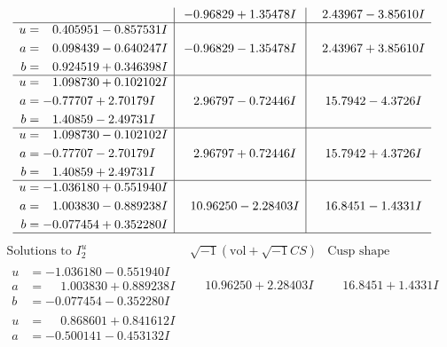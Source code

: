 \documentclass[1p]{elsarticle_modified}
\theoremstyle{definition}
\newcommand{\I}{\sqrt{-1}}
\begin{document}
$$\begin{array}{c|c|c}
 & -0.96829 + 1.35478 I & \phantom{-}2.43967 - 3.85610 I \\ \hline\begin{aligned}
u &= \phantom{-}0.405951 - 0.857531 I \\
a &= \phantom{-}0.098439 - 0.640247 I \\
b &= \phantom{-}0.924519 + 0.346398 I\end{aligned}
 & -0.96829 - 1.35478 I & \phantom{-}2.43967 + 3.85610 I \\ \hline\begin{aligned}
u &= \phantom{-}1.098730 + 0.102102 I \\
a &= -0.77707 + 2.70179 I \\
b &= \phantom{-}1.40859 - 2.49731 I\end{aligned}
 & \phantom{-}2.96797 - 0.72446 I & \phantom{-}15.7942 - 4.3726 I \\ \hline\begin{aligned}
u &= \phantom{-}1.098730 - 0.102102 I \\
a &= -0.77707 - 2.70179 I \\
b &= \phantom{-}1.40859 + 2.49731 I\end{aligned}
 & \phantom{-}2.96797 + 0.72446 I & \phantom{-}15.7942 + 4.3726 I \\ \hline\begin{aligned}
u &= -1.036180 + 0.551940 I \\
a &= \phantom{-}1.003830 - 0.889238 I \\
b &= -0.077454 + 0.352280 I\end{aligned}
 & \phantom{-}10.96250 - 2.28403 I & \phantom{-}16.8451 - 1.4331 I\\
 \hline 
 \end{array}$$\newpage$$\begin{array}{c|c|c}  
\text{Solutions to }I^u_{2}& \I (\text{vol} + \sqrt{-1}CS) & \text{Cusp shape}\\
 \hline 
\begin{aligned}
u &= -1.036180 - 0.551940 I \\
a &= \phantom{-}1.003830 + 0.889238 I \\
b &= -0.077454 - 0.352280 I\end{aligned}
 & \phantom{-}10.96250 + 2.28403 I & \phantom{-}16.8451 + 1.4331 I \\ \hline\begin{aligned}
u &= \phantom{-}0.868601 + 0.841612 I \\
a &= -0.500141 - 0.453132 I \\

\end{aligned}
\end{array}$$
\end{document}
